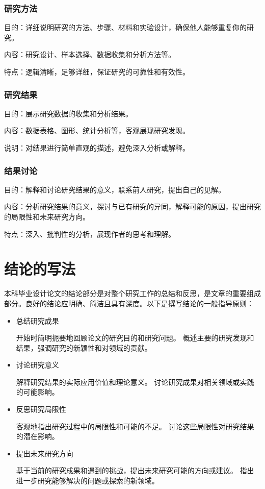 \subsubsection{研究方法}    %
目的：详细说明研究的方法、步骤、材料和实验设计，确保他人能够重复你的研究。

内容：研究设计、样本选择、数据收集和分析方法等。

特点：逻辑清晰，足够详细，保证研究的可靠性和有效性。

\subsubsection{研究结果}
目的：展示研究数据的收集和分析结果。

内容：数据表格、图形、统计分析等，客观展现研究发现。

说明：对结果进行简单直观的描述，避免深入分析或解释。

\subsubsection{结果讨论}
目的：解释和讨论研究结果的意义，联系前人研究，提出自己的见解。

内容：分析研究结果的意义，探讨与已有研究的异同，解释可能的原因，提出研究的局限性和未来研究方向。

特点：深入、批判性的分析，展现作者的思考和理解。


\section{结论的写法}

本科毕业设计论文的结论部分是对整个研究工作的总结和反思，是文章的重要组成部分。良好的结论应明确、简洁且具有深度。以下是撰写结论的一般指导原则：

\begin{itemize}         %
\item 总结研究成果

开始时简明扼要地回顾论文的研究目的和研究问题。
概述主要的研究发现和结果，强调研究的新颖性和对领域的贡献。

\item 讨论研究意义

解释研究结果的实际应用价值和理论意义。
讨论研究成果对相关领域或实践的可能影响。

\item 反思研究局限性

客观地指出研究过程中的局限性和可能的不足。
讨论这些局限性对研究结果的潜在影响。

\item 提出未来研究方向

基于当前的研究成果和遇到的挑战，提出未来研究可能的方向或建议。
指出进一步研究能够解决的问题或探索的新领域。
\end{itemize}


